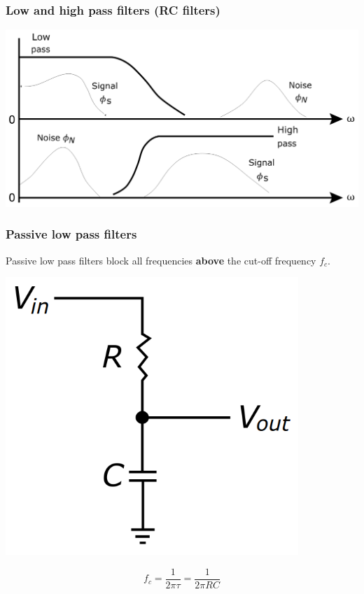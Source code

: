 \documentclass[11pt]{article}
\begin{document}
\subsubsection{Low and high pass filters (RC filters)}
\label{sec:orgf283fa4}
\begin{center}
\includegraphics[width=.9\linewidth]{./images/low-and-high-pass-filters.png}
\end{center}

 \newpage
\subsubsection{Passive low pass filters}
\label{sec:org44a38e6}
Passive low pass filters block all frequencies \textbf{above} the cut-off frequency \(f_c\).
\begin{center}
\includegraphics[width=.9\linewidth]{./images/passive-low-pass-filter.png}
\end{center}
\[f_c = \frac{1}{2 \pi \tau} = \frac{1}{2 \pi RC}\]
\end{document}
